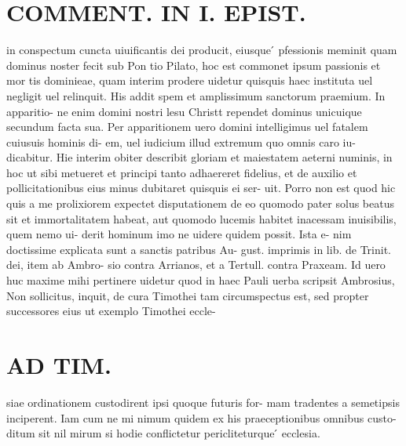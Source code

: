 \documentclass{article}
\begin{document}
\begin{pages}
\section*{COMMENT. IN I. EPIST. }\pstart in conspectum cuncta uiuificantis dei producit, eiusque ́ pfessionis meminit quam dominus noster fecit sub Pon tio Pilato, hoc est commonet ipsum passionis et mor tis dominieae, quam interim prodere uidetur quisquis haec instituta uel negligit uel relinquit. His addit spem et amplissimum sanctorum praemium. In apparitio- ne enim domini nostri lesu Christt rependet dominus unicuique secundum facta sua. Per apparitionem uero domini intelligimus uel fatalem cuiusuis hominis di- em, uel iudicium illud extremum quo omnis caro iu- dicabitur. Hie interim obiter describit gloriam et maiestatem aeterni numinis, in hoc ut sibi metueret et principi tanto adhaereret fidelius, et de auxilio et pollicitationibus eius minus dubitaret quisquis ei ser- uit. Porro non est quod hic quis a me prolixiorem expectet disputationem de eo quomodo pater solus beatus sit et immortalitatem habeat, aut quomodo lucemis habitet inacessam inuisibilis, quem nemo ui- derit hominum imo ne uidere quidem possit. Ista e- nim doctissime explicata sunt a sanctis patribus Au- gust. imprimis in lib. de Trinit. dei, item ab Ambro- sio contra Arrianos, et a Tertull. contra Praxeam. Id uero huc maxime mihi pertinere uidetur quod in haec Pauli uerba scripsit Ambrosius, Non sollicitus, inquit, de cura Timothei tam circumspectus est, sed propter successores eius ut exemplo Timothei eccle-  \pend
\section*{AD TIM. }
\marginpar{[ p.172 ]}\pstart siae ordinationem custodirent ipsi quoque futuris for- mam tradentes a semetipsis inciperent. Iam cum ne mi nimum quidem ex his praeceptionibus omnibus custo- ditum sit nil mirum si hodie conflictetur pericliteturque ́ ecclesia.  \pend
{}
{}

\end{pages}
\end{document}
